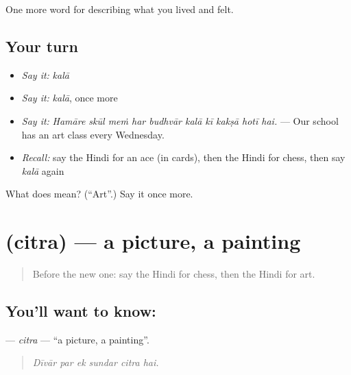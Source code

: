\begin{grammarlens}[title={What you've built}]
One more word for describing what you lived and felt.
\end{grammarlens}

\subsection*{Your turn}
\begin{itemize}
\raggedright
  \item \emph{Say it:} \emph{kalā}
  \item \emph{Say it:} \emph{kalā}, once more
  \item \emph{Say it:} \emph{Hamāre skūl meṁ har budhvār kalā kī kakṣā hotī hai.} — Our school has an art class every Wednesday.
  \item \emph{Recall:} say the Hindi for an ace (in cards), then the Hindi for chess, then say \emph{kalā} again
\end{itemize}

\begin{tcolorbox}[breakable,colback=teal!4,colframe=teal!35!black,title={Before you move on}]
What does  mean? (\textquotedblleft{}Art\textquotedblright{}.) Say it once more.
\end{tcolorbox}
\section[\texorpdfstring{\hi{चित्र} (citra)}{चित्र (citra)}]{ (citra) — a picture, a painting}

\label{lesson:HI-C527-citra}



\begin{quote}
Before the new one: say the Hindi for chess, then the Hindi for art.
\end{quote}

\subsection*{You'll want to know: }
\textbf{} — \emph{citra} — \textquotedblleft{}a picture, a painting\textquotedblright{}.

\begin{quote}
     
\end{quote}

\begin{quote}
\emph{Dīvār par ek sundar citra hai.}
\end{quote}

